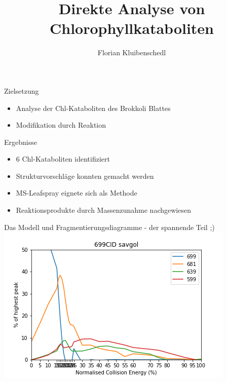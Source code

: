 \documentclass[12pt]{beamer}
\author{Florian Kluibenschedl}
\title{Direkte Analyse von Chlorophyllkataboliten}
\begin{document}
\begin{frame}
\titlepage
\end{frame}


\begin{frame}{Zielsetzung}
 \begin{itemize}
 \item Analyse der Chl-Kataboliten des Brokkoli Blattes
 \item Modifikation durch Reaktion
 \end{itemize}
\end{frame}

\begin{frame}{Ergebnisse}
 \begin{itemize}
 \item 6 Chl-Kataboliten identifiziert
 \item Strukturvorschläge konnten gemacht werden
 \item MS-Leafspray eignete sich als Methode
 \item Reaktionsprodukte durch Massenzunahme nachgewiesen
 \end{itemize}
\end{frame}

\begin{frame}{Das Modell und Fragmentierungsdiagramme - der spannende Teil ;)}
 \includegraphics[scale=0.65]{699CID-savgol1.png}
\end{frame}
\end{document}
